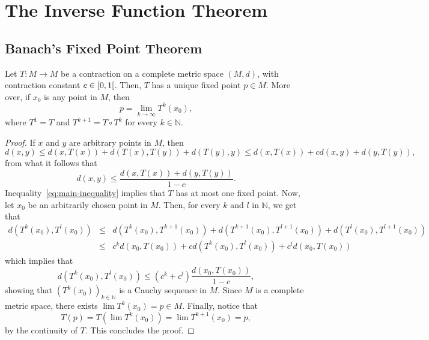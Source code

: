 \chapter{The Inverse Function Theorem}\label{chp:the_inverse_function_theorem}

\section{Banach's Fixed Point Theorem}\label{sec:banach_s_fixed_point_theorem}

\begin{theorem}\label{thm:banach's fixed point theorem}
	Let \(T:{M}\to{M}\) be a contraction on a complete metric space \((M,d)\),
	with contraction constant \({c}\in{\rinterval{0}{1}}\). Then, \(T\) has a
	unique fixed point \({p}\in{M}\). More over, if \(x_{0}\) is any point in
	\(M\), then \[p=\lim_{k\to\infty}T^{k}(x_{0}),\] where \(T^{1}=T\) and
	\(T^{k+1}=T\circ{T^{k}}\) for every \({k}\in{\mathbb{N}}\).
\end{theorem}

\begin{proof}
	If \(x\) and \(y\) are arbitrary points in \(M\), then
	\[
		d(x,y)
		\leqslant
		d(x,T(x)) + d(T(x),T(y)) + d(T(y),y)
		\leqslant
		d(x,T(x)) + cd(x,y) + d(y,T(y)),
	\]
	from what it follows that
	\begin{equation}\label{eq:main-inequality}
		d(x,y)
		\leqslant
		\frac{d(x,T(x)) + d(y,T(y))}{1 - c}.
	\end{equation}
	Inequality~\eqref{eq:main-inequality} implies that \(T\) has at most one
	fixed point. Now, let \(x_{0}\) be an arbitrarily chosen point in \(M\).
	Then, for every \(k\) and \(l\) in \(\mathbb{N}\), we get that
	\[
		\begin{array}{rcl}
			d(T^{k}(x_{0}),T^{l}(x_{0}))
			 & \leqslant &
			d(T^{k}(x_{0}),T^{k+1}(x_{0}))
			+
			d(T^{k+1}(x_{0}),T^{l+1}(x_{0}))
			+
			d(T^{l}(x_{0}),T^{l+1}(x_{0}))
			\\
			 & \leqslant &
			c^{k}d(x_{0},T(x_{0}))
			+
			cd(T^{k}(x_{0}),T^{l}(x_{0}))
			+
			c^{l}d(x_{0},T(x_{0}))
		\end{array}
	\]
	which implies that
	\begin{equation}\label{eq:the-sequence-of-iterates-is-cauchy}
		d(T^{k}(x_{0}),T^{l}(x_{0}))
		\leqslant
		(c^{k}+c^{l})\frac{d(x_{0},T(x_{0}))}{1-c},
	\end{equation}
	showing that \(\left(T^{k}(x_{0})\right)_{{k}\in{\mathbb{N}}}\) is a Cauchy
	sequence in \(M\). Since \(M\) is a complete metric space, there exists
	\(\lim{T^{k}(x_{0})}=p\in{M}\). Finally, notice that
	\[
		T(p)=T(\lim{T^{k}(x_{0})})=\lim{T^{k+1}(x_{0})}=p,
	\]
	by the continuity of \(T\). This concludes the proof.
\end{proof}

